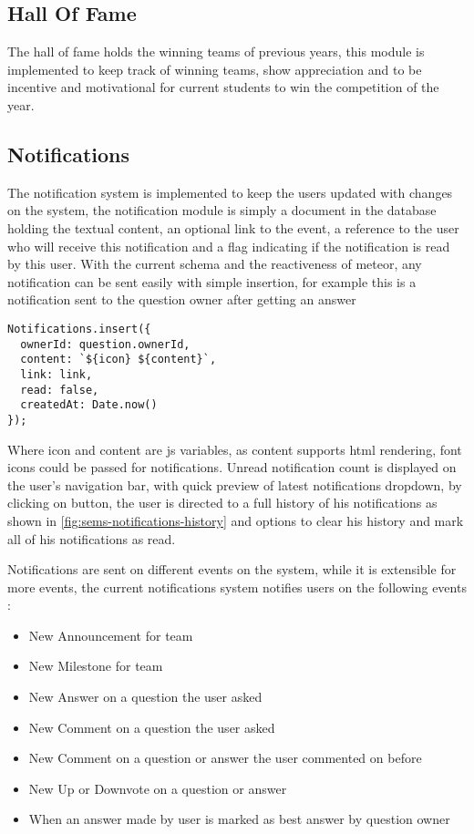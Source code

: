 \subsection{Hall Of Fame}
\label{sub:hall-of-fame}
The hall of fame holds the winning teams of previous years, this module is implemented to keep track of winning teams, show appreciation and to
be incentive and motivational for current students to win the competition of the year.

\subsection{Notifications}
\label{sub:notifications}
The notification system is implemented to keep the users updated with changes on the system, the notification module is
simply a document in the database holding the textual content, an optional link to the event, a reference to the user who will receive this
notification and a flag indicating if the notification is read by this user. With the current schema and the reactiveness of meteor,
any notification can be sent easily with simple insertion, for example this is a notification sent to the question owner
after getting an answer
\vspace{15cm}
\begin{verbatim}
Notifications.insert({
  ownerId: question.ownerId,
  content: `${icon} ${content}`,
  link: link,
  read: false,
  createdAt: Date.now()
});
\end{verbatim}

\newParagraph
Where icon and content are \ac{js} variables, as content supports html rendering, font icons could be passed
for notifications. Unread notification count is displayed on the user's navigation bar, with quick preview of latest notifications dropdown,
by clicking on  button, the user is directed to a full history of his notifications as shown in \ref{fig:sems-notifications-history}
and options to clear his history and mark all of his notifications as read.

\newParagraph
Notifications are sent on different events on the system, while it is extensible for more events, the current notifications system notifies
users on the following events :
\begin{itemize}
  \item New Announcement for team
  \item New Milestone for team
  \item New Answer on a question the user asked
  \item New Comment on a question the user asked
  \item New Comment on a question or answer the user commented on before
  \item New Up or Downvote on a question or answer
  \item When an answer made by user is marked as best answer by question owner
\end{itemize}

